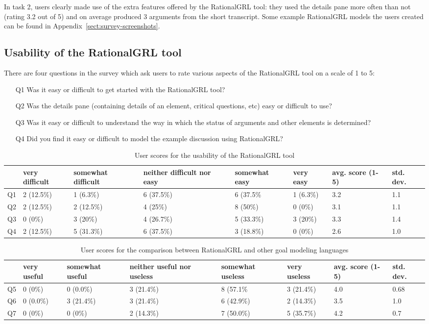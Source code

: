 In task 2, users clearly made use of the extra features offered by the RationalGRL tool: they used the details pane more often than not (rating 3.2 out of 5) and on average produced 3 arguments from the short transcript. Some example RationalGRL models the users created can be found in Appendix~\ref{sect:survey-screenshots}.

\subsection{Usability of the RationalGRL tool}

There are four questions in the survey which ask users to rate various aspects of the RationalGRL tool on a scale of 1 to 5:
\begin{itemize}
\item[Q1] Was it easy or difficult to get started with the RationalGRL tool?
\item[Q2] Was the details pane (containing details of an element, critical questions, etc) easy or difficult to use?
\item[Q3] Was it easy or difficult to understand the way in which the status of arguments and other elements is determined?
\item[Q4] Did you find it easy or difficult to model the example discussion using RationalGRL?
\end{itemize}

\begin{table*}[t]
\centering
\begin{tabularx}{0.95\textwidth}{l|l|l|l|l|l|l|l}
& very difficult & somewhat difficult & neither difficult nor easy & somewhat easy & very easy & avg. score (1-5) & std. dev.\\
\hline
Q1 & 2 (12.5\%) & 1 (6.3\%) & 6 (37.5\%) & 6 (37.5\% & 1 (6.3\%) & 3.2 & 1.1\\
Q2 & 2 (12.5\%) & 2 (12.5\%) & 4 (25\%) & 8 (50\%) & 0 (0\%) & 3.1 & 1.1\\
Q3 & 0 (0\%) & 3 (20\%) & 4 (26.7\%) & 5 (33.3\%) & 3 (20\%) & 3.3 & 1.4\\
Q4 & 2 (12.5\%) & 5 (31.3\%) & 6 (37.5\%) & 3 (18.8\%) & 0 (0\%) & 2.6 & 1.0
\end{tabularx}
\caption{User scores for the usability of the RationalGRL tool}
\label{table:survey:table1}
\end{table*}

\begin{table*}[t]
\centering
\begin{tabularx}{0.95\textwidth}{l|l|l|l|l|l|l|l}
& very useful & somewhat useful & neither useful nor useless & somewhat useless & very useless & avg. score (1-5) & std. dev.\\
\hline
Q5 & 0 (0\%) & 0 (0.0\%) & 3 (21.4\%) & 8 (57.1\% & 3 (21.4\%) & 4.0 & 0.68\\
Q6 & 0 (0.0\%) & 3 (21.4\%) & 3 (21.4\%) & 6 (42.9\%) & 2 (14.3\%) & 3.5 & 1.0\\
Q7 & 0 (0\%) & 0 (0\%) & 2 (14.3\%) & 7 (50.0\%) & 5 (35.7\%) & 4.2 & 0.7
\end{tabularx}
\caption{User scores for the comparison between RationalGRL and other goal modeling languages}
\label{table:survey:table2}
\end{table*}

